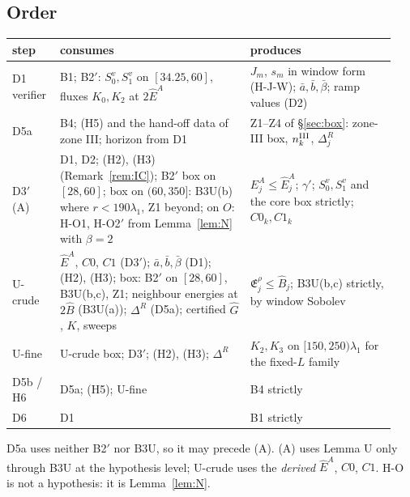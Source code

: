 \documentclass[11pt]{article}
\theoremstyle{definition}\newtheorem{definition}[theorem]{Definition}
\theoremstyle{remark}\newtheorem{remark}[theorem]{Remark}
\newcommand{\E}{\mathfrak E}\newcommand{\B}{\mathfrak B}\newcommand{\Bh}{\hat B}\newcommand{\Eh}{\hat E^A}
\begin{document}
\subsection{Order}
\begin{center}\small\begin{tabular}{@{}p{0.11\linewidth}p{0.47\linewidth}p{0.36\linewidth}@{}}\toprule
step & consumes & produces\\\midrule
D1 verifier & B1; B2$'$: $S_0^v,S_1^v$ on $[34.25,60]$, fluxes $K_0,K_2$ at $2\Eh$ & $J_m$, $s_m$ in window form (H-J-W); $\bar a,\bar b,\bar\beta$; ramp values (D2)\\
D5a & B4; (H5) and the hand-off data of zone III; horizon from D1 & Z1--Z4 of \S\ref{sec:box}: zone-III box, $n^{\rm III}_k$, $\Delta^R_j$\\
D3$'$ (A) & D1, D2; (H2), (H3) (Remark~\ref{rem:IC}); B2$'$ box on $[28,60]$; box on $(60,350]$: B3U(b) where $r<190\lambda_1$, Z1 beyond; on $O$: H-O1, H-O2$'$ from Lemma~\ref{lem:N} with $\beta=2$ & $E^A_j\le\Eh_j$; $\gamma'$; $S_0^v,S_1^v$ and the core box strictly; $C0_k,C1_k$\\
U-crude & $\Eh$, $C0$, $C1$ (D3$'$); $\bar a,\bar b,\bar\beta$ (D1); (H2), (H3); box: B2$'$ on $[28,60]$, B3U(b,c), Z1; neighbour energies at $2\Bh$ (B3U(a)); $\Delta^R$ (D5a); certified $\hat G$, $K$, sweeps & $\E^\rho_j\le\Bh_j$; B3U(b,c) strictly, by window Sobolev\\
U-fine & U-crude box; D3$'$; (H2), (H3); $\Delta^R$ & $K_2,K_3$ on $[150,250)\lambda_1$ for the fixed-$L$ family\\
D5b / H6 & D5a; (H5); U-fine & B4 strictly\\
D6 & D1 & B1 strictly\\\bottomrule\end{tabular}\end{center}
D5a uses neither B2$'$ nor B3U, so it may precede (A). (A) uses Lemma U only through B3U at the hypothesis level; U-crude uses the \emph{derived} $\Eh$, $C0$, $C1$. H-O is not a hypothesis: it is Lemma~\ref{lem:N}.
\end{document}
